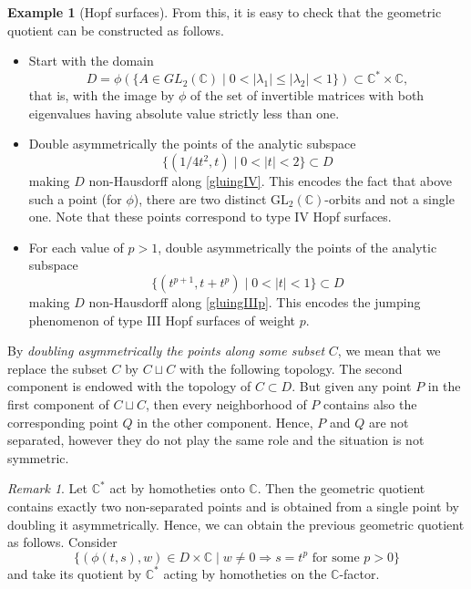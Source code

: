 \documentclass[JEP,XML,SOM,Unicode]{cedram}
\newcommand{\GL}{\mathrm{GL}}
\theoremstyle{plain}
\theoremstyle{definition}
\newtheorem{example}[theorem]{Example}
\theoremstyle{remark}
\newtheorem{remark}[theorem]{Remark}
\numberwithin{equation}{section}
\newcommand{\CC}{{\mathbb{C}}}
\begin{document}
\begin{example}[Hopf surfaces]
From this, it is easy to check that the geometric quotient can be constructed as follows.
\begin{itemize}
\item Start with the domain
\begin{equation}
\label{domain}
D=\phi(\{A\in GL_2(\CC)\mid 0<\vert \lambda_1\vert\leq \vert\lambda_2\vert <1\})\subset\CC^*\times\CC,
\end{equation}
that is, with the image by $\phi$ of the set of invertible matrices with both eigenvalues having absolute value strictly less than one.
\item Double asymmetrically the points of the analytic subspace
\begin{equation}
\label{gluingIV}
\{(1/4t^2,t)\mid 0<\vert t\vert <2\}\subset D
\end{equation}
making $D$ non-Hausdorff along \eqref{gluingIV}. This encodes the fact that above such a point (for $\phi$), there are two distinct $\GL_2(\CC)$-orbits and not a single one. Note that these points correspond to type IV Hopf surfaces.
\item For each value of $p>1$, double asymmetrically the points of the analytic subspace%
\begin{equation}
\label{gluingIIIp}
\{(t^{p+1},t+t^p)\mid 0<\vert t\vert <1\}\subset D
\end{equation}
making $D$ non-Hausdorff along \eqref{gluingIIIp}. This encodes the jumping phenomenon of type III Hopf surfaces of weight $p$.
\end{itemize}

By \emph{doubling asymmetrically the points along some subset} $C$, we mean that we replace the subset $C$ by $C\sqcup C$ with the following topology. The second component is endowed with the topology of $C\subset D$. But given any point $P$ in the first component of $C\sqcup C$, then every neighborhood of $P$ contains also the corresponding point $Q$ in the other component. Hence, $P$ and $Q$ are not separated, however they do not play the same role and the situation is not symmetric.

\begin{remark}
\label{Cstar}
Let $\CC^*$ act by homotheties onto $\CC$. Then the geometric quotient contains exactly two non-separated points and is obtained from a single point by doubling it asymmetrically. Hence, we can obtain the previous geometric quotient as follows. Consider
\begin{equation}
\{(\phi(t,s),w)\in D\times\CC\mid w\not =0\Rightarrow s=t^p \text{ for some }p>0\}
\end{equation}
and take its quotient by $\CC^*$ acting by homotheties on the $\CC$-factor.
\end{remark}


\end{example}
\end{document}
